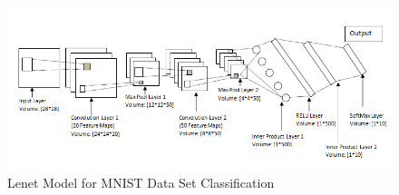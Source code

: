 \begin{figure}[h]
\centering
\includegraphics[scale=0.8]{figures/lenet5.PNG}
\caption{Lenet Model for MNIST Data Set Classification}
\label{fig:Lenet Application}
\end{figure}
